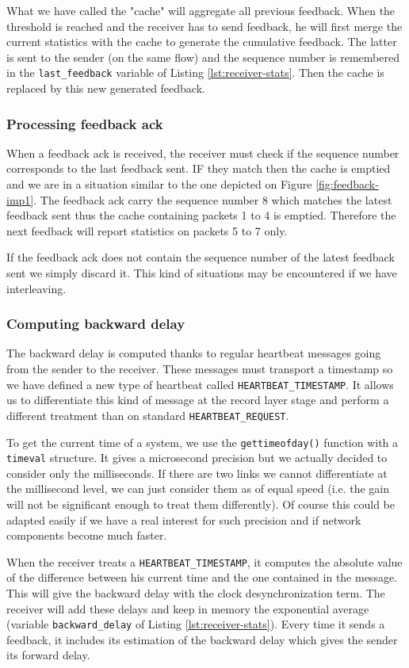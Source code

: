 What we have called the "cache" will aggregate all previous feedback. When the threshold is reached and the receiver has to send feedback, he will first merge the current statistics with the cache to generate the cumulative feedback. The latter is sent to the sender (on the same flow) and the sequence number is remembered in the \texttt{last\_feedback} variable of Listing \ref{lst:receiver-stats}. Then the cache is replaced by this new generated feedback.


\subsubsection{Processing feedback ack}

When a feedback ack is received, the receiver must check if the sequence number corresponds to the last feedback sent. IF they match then the cache is emptied and we are in a situation similar to the one depicted on Figure \ref{fig:feedback-imp1}. The feedback ack carry the sequence number 8 which matches the latest feedback sent thus the cache containing packets 1 to 4 is emptied. Therefore the next feedback will report statistics on packets 5 to 7 only.

If the feedback ack does not contain the sequence number of the latest feedback sent we simply discard it. This kind of situations may be encountered if we have interleaving. 


\subsubsection{Computing backward delay}

The backward delay is computed thanks to regular heartbeat messages going from the sender to the receiver. These messages must transport a timestamp so we have defined a new type of heartbeat called \texttt{HEARTBEAT\_TIMESTAMP}. It allows us to differentiate this kind of message at the record layer stage and perform a different treatment than on standard \texttt{HEARTBEAT\_REQUEST}. 

To get the current time of a system, we use the \texttt{gettimeofday()} function with a \texttt{timeval} structure. It gives a microsecond precision but we actually decided to consider only the milliseconds. If there are two links we cannot differentiate at the millisecond level, we can just consider them as of equal speed (i.e. the gain will not be significant enough to treat them differently). Of course this could be adapted easily if we have a real interest for such precision and if network components become much faster.

When the receiver treats a \texttt{HEARTBEAT\_TIMESTAMP}, it computes the absolute value of the difference between his current time and the one contained in the message. This will give the backward delay with the clock desynchronization term. The receiver will add these delays and keep in memory the exponential average (variable \texttt{backward\_delay} of Listing \ref{lst:receiver-stats}). Every time it sends a feedback, it includes its estimation of the backward delay which gives the sender its forward delay.



